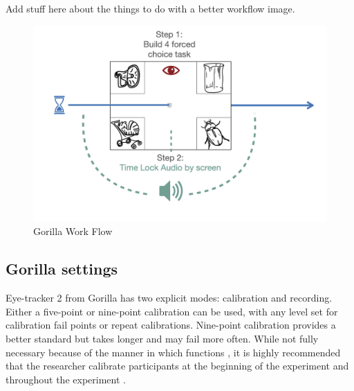 Add stuff here about the things to do with a better workflow image. 

\begin{figure}[h]
    \centering
    \includegraphics[scale=.5]{figures/Gorilla_work_flow.png}
    \caption{Gorilla Work Flow}
    \label{fig:Gorilla_work_flow}
\end{figure}

\subsection{Gorilla settings}

Eye-tracker 2 from Gorilla has two explicit modes: calibration and recording. Either a five-point or nine-point calibration can be used, with any level set for calibration fail points or repeat calibrations. Nine-point calibration provides a better standard but takes longer and may fail more often. While not fully necessary because of the manner in which   functions \parencite[e.g.,][]{ Chen_et_al_2001}, it is highly recommended that the researcher calibrate participants at the beginning of the experiment and throughout the experiment \parencite[][]{Prystauka_Altmann_Rothman_2023}. 

